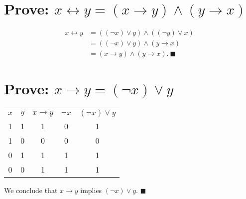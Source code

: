 \documentclass[12pt]{article}
\begin{document}
\section{Prove: $x\leftrightarrow y=(x\rightarrow y)\land(y\rightarrow x)$}
\begin{align*}
x\leftrightarrow y
&=((\lnot x)\lor y)\land((\lnot y)\lor x)\\
&=((\lnot x)\lor y)\land(y\rightarrow x)\\
&=(x\rightarrow y)\land(y\rightarrow x).~\blacksquare
\end{align*}
\section{Prove: $x\rightarrow y=(\lnot x)\lor y$}
\begin{center}\begin{tabular}{c|c||c||c|c}
$x$&$y$&$x\rightarrow y$&$\lnot x$&$(\lnot x)\lor y$\\
1&1&1&0&1\\
1&0&0&0&0\\
0&1&1&1&1\\
0&0&1&1&1
\end{tabular}\end{center}
We conclude that $x\rightarrow y$ implies $(\lnot x)\lor y$. $\blacksquare$
\end{document}
